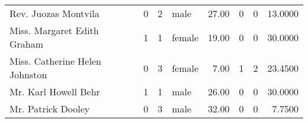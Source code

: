 \begin{tabular}{lrrlrrrr}
Rev. Juozas Montvila                               &         0 &       2 &    male &  27.00 &                        0 &                        0 &   13.0000 \\
Miss. Margaret Edith Graham                        &         1 &       1 &  female &  19.00 &                        0 &                        0 &   30.0000 \\
Miss. Catherine Helen Johnston                     &         0 &       3 &  female &   7.00 &                        1 &                        2 &   23.4500 \\
Mr. Karl Howell Behr                               &         1 &       1 &    male &  26.00 &                        0 &                        0 &   30.0000 \\
Mr. Patrick Dooley                                 &         0 &       3 &    male &  32.00 &                        0 &                        0 &    7.7500 \\
\bottomrule
\end{tabular}
